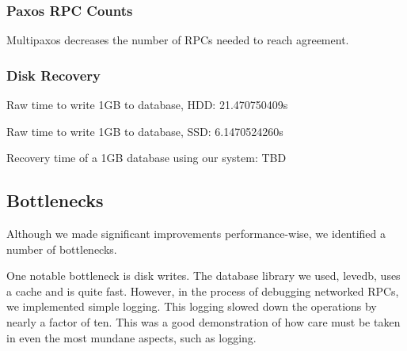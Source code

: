 \documentclass[letterpaper,10pt]{article}
\begin{document}
\subsubsection{Paxos RPC Counts}

Multipaxos decreases the number of RPCs needed to reach agreement.

\begin{table}[H]
\centering
{}
\end{table}

\subsubsection{Disk Recovery}
Raw time to write 1GB to database, HDD:  21.470750409s

Raw time to write 1GB to database, SSD:  6.1470524260s

Recovery time of a 1GB database using our system: TBD

\subsection{Bottlenecks}
Although we made significant improvements performance-wise, we
identified a number of bottlenecks.

One notable bottleneck is disk writes. The database library we used,
levedb, uses a cache and is quite fast. However, in the process of
debugging networked RPCs, we implemented simple logging. This logging
slowed down the operations by nearly a factor of ten. This was a good
demonstration of how care must be taken in even the most mundane
aspects, such as logging.
\end{document}
